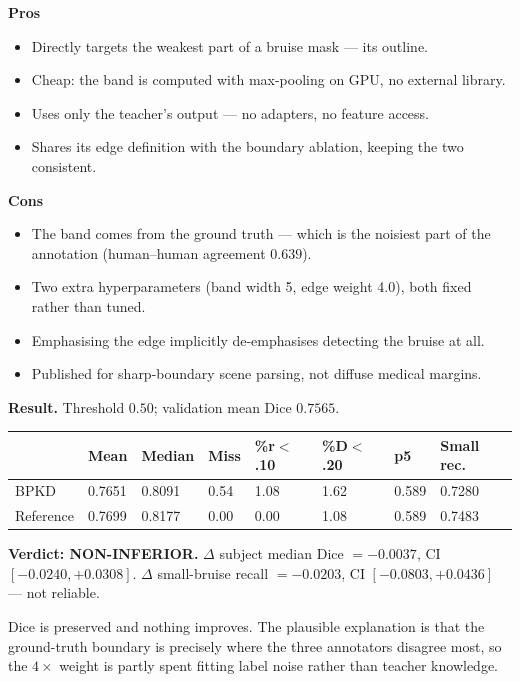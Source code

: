 \documentclass[11pt]{article}
\newcommand{\pro}[1]{\item[\textcolor{proscol}{$+$}] #1}
\newcommand{\con}[1]{\item[\textcolor{conscol}{$-$}] #1}
\begin{document}
\begin{minipage}[t]{0.475\textwidth}
\textbf{\textcolor{proscol}{Pros}}
\begin{itemize}[leftmargin=1.5em,itemsep=1pt,label={},labelwidth=1em,labelsep=0.4em,align=left]
  \pro{Directly targets the weakest part of a bruise mask --- its outline.}
  \pro{Cheap: the band is computed with max-pooling on GPU, no external library.}
  \pro{Uses only the teacher's output --- no adapters, no feature access.}
  \pro{Shares its edge definition with the boundary ablation, keeping the two consistent.}
\end{itemize}
\end{minipage}\hfill%
\begin{minipage}[t]{0.475\textwidth}
\textbf{\textcolor{conscol}{Cons}}
\begin{itemize}[leftmargin=1.5em,itemsep=1pt,label={},labelwidth=1em,labelsep=0.4em,align=left]
  \con{The band comes from the ground truth --- which is the noisiest part of the annotation
       (human--human agreement $0.639$).}
  \con{Two extra hyperparameters (band width 5, edge weight 4.0), both fixed rather than tuned.}
  \con{Emphasising the edge implicitly de-emphasises detecting the bruise at all.}
  \con{Published for sharp-boundary scene parsing, not diffuse medical margins.}
\end{itemize}
\end{minipage}

\vspace{6pt}
\textbf{Result.} Threshold $0.50$; validation mean Dice $0.7565$.

\begin{center}\small
\begin{tabular}{K q q q q q q M}
\toprule
& \textbf{Mean} & \textbf{Median} & \textbf{Miss} & \textbf{\%r$<$.10} & \textbf{\%D$<$.20} &
\textbf{p5} & \textbf{Small rec.} \\
\midrule
BPKD      & 0.7651 & 0.8091 & 0.54 & 1.08 & 1.62 & 0.589 & 0.7280 \\
Reference & 0.7699 & 0.8177 & 0.00 & 0.00 & 1.08 & 0.589 & 0.7483 \\
\bottomrule
\end{tabular}
\end{center}

\textbf{Verdict: NON-INFERIOR.}
$\Delta$ subject median Dice $=-0.0037$, CI $[-0.0240,+0.0308]$.
$\Delta$ small-bruise recall $=-0.0203$, CI $[-0.0803,+0.0436]$ --- not reliable.

Dice is preserved and nothing improves. The plausible explanation is that the ground-truth
boundary is precisely where the three annotators disagree most, so the $4\times$ weight is partly
spent fitting label noise rather than teacher knowledge.
\end{document}
